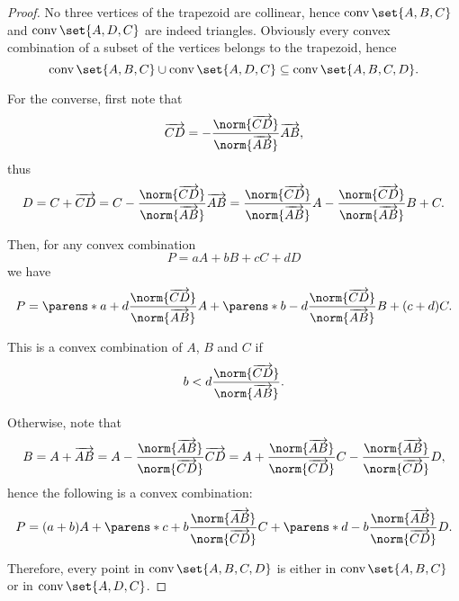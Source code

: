 \begin{proof}
  No three vertices of the trapezoid are collinear, hence \( \conv\set{ A, B, C } \) and \( \conv\set{ A, D, C } \) are indeed triangles. Obviously every convex combination of a subset of the vertices belongs to the trapezoid, hence
  \begin{equation*}
    \conv\set{ A, B, C } \cup \conv\set{ A, D, C } \subseteq \conv\set{ A, B, C, D }.
  \end{equation*}

  For the converse, first note that
  \begin{equation*}
    \vect{CD} = -\frac {\norm{\vect{CD}}} {\norm{\vect{AB}}} \vect{AB},
  \end{equation*}
  thus
  \begin{equation*}
    D = C + \vect{CD} = C - \frac {\norm{\vect{CD}}} {\norm{\vect{AB}}} \vect{AB} = \frac {\norm{\vect{CD}}} {\norm{\vect{AB}}} A - \frac {\norm{\vect{CD}}} {\norm{\vect{AB}}} B + C.
  \end{equation*}

  Then, for any convex combination
  \begin{equation*}
    P = aA + bB + cC + dD
  \end{equation*}
  we have
  \begin{equation*}
    P
    =
    \parens*{ a + d \frac {\norm{\vect{CD}}} {\norm{\vect{AB}}} } A +
    \parens*{ b - d \frac {\norm{\vect{CD}}} {\norm{\vect{AB}}} } B +
    (c + d) C.
  \end{equation*}

  This is a convex combination of \( A \), \( B \) and \( C \) if
  \begin{equation*}
    b < d \frac {\norm{\vect{CD}}} {\norm{\vect{AB}}}.
  \end{equation*}

  Otherwise, note that
  \begin{equation*}
    B = A + \vect{AB} = A - \frac {\norm{\vect{AB}}} {\norm{\vect{CD}}} \vect{CD} = A + \frac {\norm{\vect{AB}}} {\norm{\vect{CD}}} C - \frac {\norm{\vect{AB}}} {\norm{\vect{CD}}} D,
  \end{equation*}
  hence the following is a convex combination:
  \begin{equation*}
    P
    =
    (a + b) A +
    \parens*{ c + b \frac {\norm{\vect{AB}}} {\norm{\vect{CD}}} } C +
    \parens*{ d - b \frac {\norm{\vect{AB}}} {\norm{\vect{CD}}} } D.
  \end{equation*}

  Therefore, every point in \( \conv\set{ A, B, C, D } \) is either in \( \conv\set{ A, B, C } \) or in \( \conv\set{ A, D, C } \).
\end{proof}

